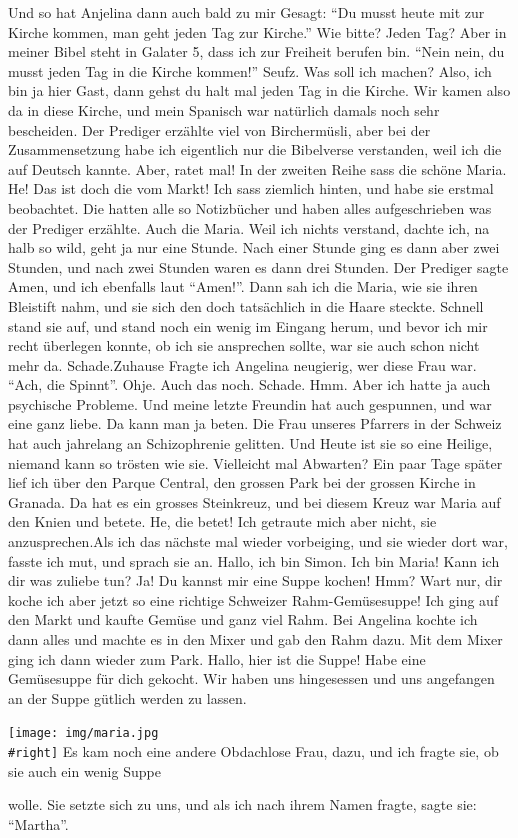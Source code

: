 \documentclass[
]{article}
\begin{document}
Und so hat Anjelina dann auch bald zu mir Gesagt: ``Du musst heute mit
zur Kirche kommen, man geht jeden Tag zur Kirche.'' Wie bitte? Jeden
Tag? Aber in meiner Bibel steht in Galater 5, dass ich zur Freiheit
berufen bin. ``Nein nein, du musst jeden Tag in die Kirche kommen!''
Seufz. Was soll ich machen? Also, ich bin ja hier Gast, dann gehst du
halt mal jeden Tag in die Kirche. Wir kamen also da in diese Kirche, und
mein Spanisch war natürlich damals noch sehr bescheiden. Der Prediger
erzählte viel von Birchermüsli, aber bei der Zusammensetzung habe ich
eigentlich nur die Bibelverse verstanden, weil ich die auf Deutsch
kannte. Aber, ratet mal! In der zweiten Reihe sass die schöne Maria. He!
Das ist doch die vom Markt! Ich sass ziemlich hinten, und habe sie
erstmal beobachtet. Die hatten alle so Notizbücher und haben alles
aufgeschrieben was der Prediger erzählte. Auch die Maria. Weil ich
nichts verstand, dachte ich, na halb so wild, geht ja nur eine Stunde.
Nach einer Stunde ging es dann aber zwei Stunden, und nach zwei Stunden
waren es dann drei Stunden. Der Prediger sagte Amen, und ich ebenfalls
laut ``Amen!''. Dann sah ich die Maria, wie sie ihren Bleistift nahm,
und sie sich den doch tatsächlich in die Haare steckte. Schnell stand
sie auf, und stand noch ein wenig im Eingang herum, und bevor ich mir
recht überlegen konnte, ob ich sie ansprechen sollte, war sie auch schon
nicht mehr da. Schade.Zuhause Fragte ich Angelina neugierig, wer diese
Frau war. ``Ach, die Spinnt''. Ohje. Auch das noch. Schade. Hmm. Aber
ich hatte ja auch psychische Probleme. Und meine letzte Freundin hat
auch gespunnen, und war eine ganz liebe. Da kann man ja beten. Die Frau
unseres Pfarrers in der Schweiz hat auch jahrelang an Schizophrenie
gelitten. Und Heute ist sie so eine Heilige, niemand kann so trösten wie
sie. Vielleicht mal Abwarten? Ein paar Tage später lief ich über den
Parque Central, den grossen Park bei der grossen Kirche in Granada. Da
hat es ein grosses Steinkreuz, und bei diesem Kreuz war Maria auf den
Knien und betete. He, die betet! Ich getraute mich aber nicht, sie
anzusprechen.Als ich das nächste mal wieder vorbeiging, und sie wieder
dort war, fasste ich mut, und sprach sie an. Hallo, ich bin Simon. Ich
bin Maria! Kann ich dir was zuliebe tun? Ja! Du kannst mir eine Suppe
kochen! Hmm? Wart nur, dir koche ich aber jetzt so eine richtige
Schweizer Rahm-Gemüsesuppe! Ich ging auf den Markt und kaufte Gemüse und
ganz viel Rahm. Bei Angelina kochte ich dann alles und machte es in den
Mixer und gab den Rahm dazu. Mit dem Mixer ging ich dann wieder zum
Park. Hallo, hier ist die Suppe! Habe eine Gemüsesuppe für dich gekocht.
Wir haben uns hingesessen und uns angefangen an der Suppe gütlich werden
zu lassen.

\texttt{[image: img/maria.jpg\\\#right]} Es kam noch eine andere
Obdachlose Frau, dazu, und ich fragte sie, ob sie auch ein wenig Suppe

wolle. Sie setzte sich zu uns, und als ich nach ihrem Namen fragte,
sagte sie: ``Martha''.
\end{document}

